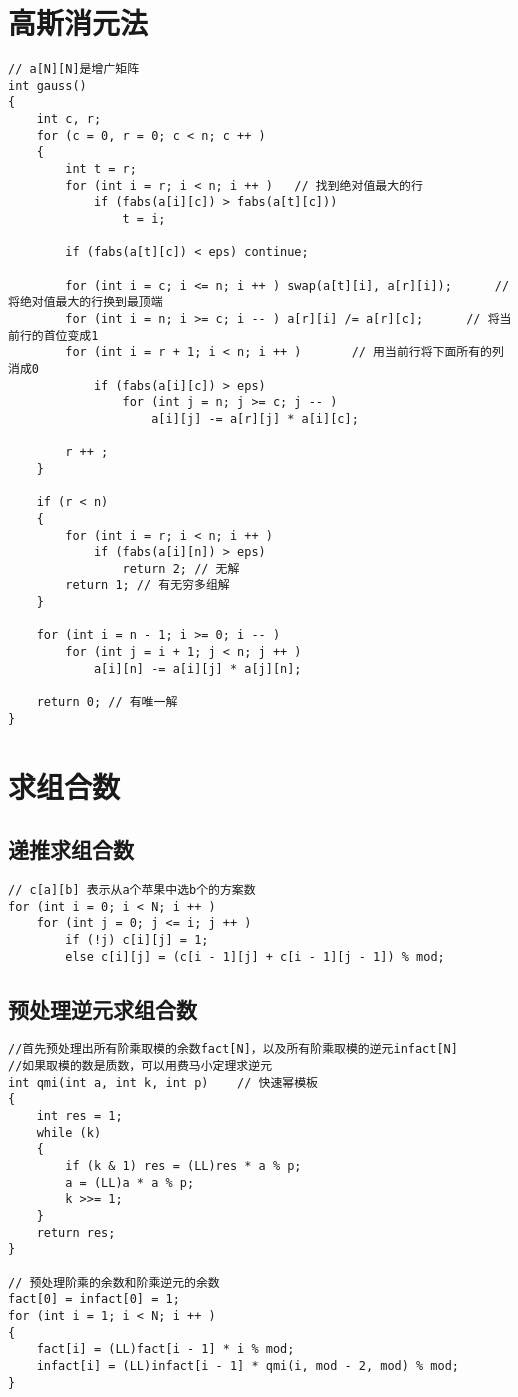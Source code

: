 \documentclass[12pt,a4paper,UTF16]{ctexbook}
\theoremstyle{plain}
\begin{document}
\section{高斯消元法}
\begin{lstlisting}
// a[N][N]是增广矩阵
int gauss()
{
    int c, r;
    for (c = 0, r = 0; c < n; c ++ )
    {
        int t = r;
        for (int i = r; i < n; i ++ )   // 找到绝对值最大的行
            if (fabs(a[i][c]) > fabs(a[t][c]))
                t = i;

        if (fabs(a[t][c]) < eps) continue;

        for (int i = c; i <= n; i ++ ) swap(a[t][i], a[r][i]);      // 将绝对值最大的行换到最顶端
        for (int i = n; i >= c; i -- ) a[r][i] /= a[r][c];      // 将当前行的首位变成1
        for (int i = r + 1; i < n; i ++ )       // 用当前行将下面所有的列消成0
            if (fabs(a[i][c]) > eps)
                for (int j = n; j >= c; j -- )
                    a[i][j] -= a[r][j] * a[i][c];

        r ++ ;
    }

    if (r < n)
    {
        for (int i = r; i < n; i ++ )
            if (fabs(a[i][n]) > eps)
                return 2; // 无解
        return 1; // 有无穷多组解
    }

    for (int i = n - 1; i >= 0; i -- )
        for (int j = i + 1; j < n; j ++ )
            a[i][n] -= a[i][j] * a[j][n];

    return 0; // 有唯一解
}
\end{lstlisting}

\section{求组合数}
\subsection{递推求组合数}
\begin{lstlisting}
// c[a][b] 表示从a个苹果中选b个的方案数
for (int i = 0; i < N; i ++ )
    for (int j = 0; j <= i; j ++ )
        if (!j) c[i][j] = 1;
        else c[i][j] = (c[i - 1][j] + c[i - 1][j - 1]) % mod;
\end{lstlisting}
\subsection{预处理逆元求组合数}
\begin{lstlisting}
//首先预处理出所有阶乘取模的余数fact[N]，以及所有阶乘取模的逆元infact[N]
//如果取模的数是质数，可以用费马小定理求逆元
int qmi(int a, int k, int p)    // 快速幂模板
{
    int res = 1;
    while (k)
    {
        if (k & 1) res = (LL)res * a % p;
        a = (LL)a * a % p;
        k >>= 1;
    }
    return res;
}

// 预处理阶乘的余数和阶乘逆元的余数
fact[0] = infact[0] = 1;
for (int i = 1; i < N; i ++ )
{
    fact[i] = (LL)fact[i - 1] * i % mod;
    infact[i] = (LL)infact[i - 1] * qmi(i, mod - 2, mod) % mod;
}
\end{lstlisting}
\end{document}
